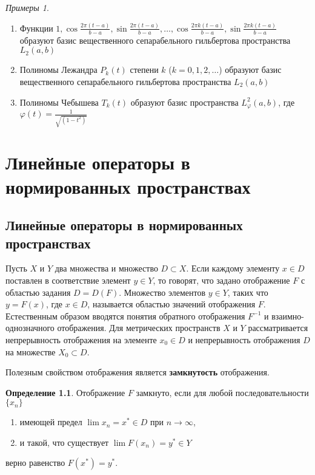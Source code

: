 \documentclass[12pt,a4paper,titlepage,oneside]{book}
\theoremstyle{definition}
\newtheorem*{definition}{Определение}
\theoremstyle{plain}
\theoremstyle{break}
\theoremstyle{remark}
\theoremstyle{remark}
\theoremstyle{remark}
\newtheorem*{examples}{Примеры}
\theoremstyle{remark}
\theoremstyle{plain}
\theoremstyle{plain}
\begin{document}
\begin{examples}
\leavevmode
\begin{enumerate}
	\item Функции $1, \cos \frac{2 \pi (t - a)}{b - a}, \sin \frac{2 \pi (t - a)}{b - a}, \ldots, \cos \frac{2 \pi k (t - a)}{b - a}, \sin \frac{2 \pi k (t - a)}{b - a}$ образуют базис вещественного сепарабельного гильбертова пространства $L_2(a, b)$
	
	\item Полиномы Лежандра $P_k(t)$ степени $k$ ($k = 0, 1, 2, \ldots$) образуют базис вещественного сепарабельного гильбертова пространства $L_2(a, b)$
	
	\item Полиномы Чебышева $T_k(t)$ образуют базис пространства $L_{\varphi}^2 (a, b)$, где $\varphi(t) = \frac{1}{\sqrt{(1 - t^2)}}$
\end{enumerate}
\end{examples}

\chapter{Линейные операторы в нормированных пространствах}

\section{Линейные операторы в нормированных пространствах}
Пусть $X$ и $Y$ два множества и множество $D \subset X$. Если каждому элементу $x \in D$ поставлен в соответствие элемент $y \in Y$, то говорят, что задано отображение $F$ с областью задания $D=D(F)$. Множество элементов $y \in Y$, таких что $y=F(x)$, где $x \in D$, называется областью значений отображения $F$. Естественным образом вводятся понятия обратного отображения ${F}^{-1}$ и взаимно-однозначного отображения. Для метрических пространств $X$ и $Y$ рассматривается непрерывность отображения на элементе $x_0 \in D$ и непрерывность отображения $D$ на множестве $X_0 \subset D$.

Полезным свойством отображения является \textbf{замкнутость} отображения.

\begin{definition} Отображение $F$ замкнуто, если для любой последовательности  $\lbrace x_n \rbrace$

\begin{enumerate}

 \item имеющей предел $\lim x_n= x^* \in D$ при $n\to\infty$,
 
 \item и такой, что существует $\lim F(x_n)= y^* \in Y$
 
\end{enumerate} 
 
верно равенство $F(x^*)=y^*$.

\end{definition}
\end{document}
